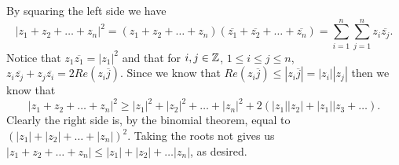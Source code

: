 \begin{solution}
  By squaring the left side we have \[|z_1 + z_2 + \ldots + z_n|^2 = (z_1 + z_2 + \ldots + z_n)(\overline{z_1} + \overline{z_2} + \ldots + \overline{z_n}) = \sum_{i = 1}^{n} \sum_{j = 1}^{n} z_i\overline{z_j}.\]
  Notice that $z_1\overline{z_1} = |z_1|^2$ and that for $i, j \in \mathbb{Z}$, $1 \le i \le j \le n$, $z_i\overline{z_j} + z_j\overline{z_i} = 2Re(z_i\overline{j})$.
  Since we know that $Re(z_i\overline{j}) \le |z_i\overline{j}| = |z_i||z_j|$ then we know that \[|z_1 + z_2 + \ldots + z_n|^2 \ge |z_1|^2 + |z_2|^2 + \ldots + |z_n|^2 + 2(|z_1||z_2| + |z_1||z_3 + \ldots).\]
  Clearly the right side is, by the binomial theorem, equal to $(|z_1| + |z_2| + \ldots + |z_n|)^2$.
  Taking the roots not gives us $|z_1 + z_2 + \ldots + z_n| \le |z_1| + |z_2| + \ldots |z_n|$, as desired.
\end{solution}
